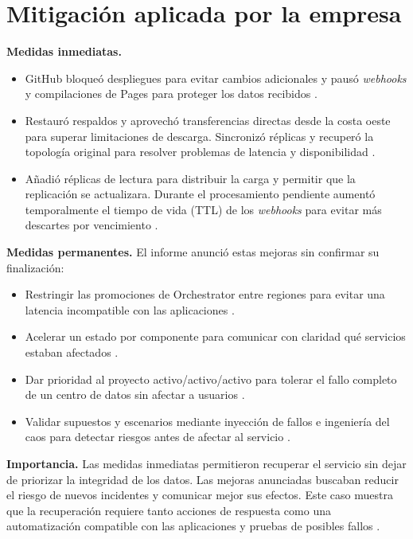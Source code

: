 \documentclass[11pt,a4paper]{article}
\begin{document}
\section{Mitigaci\'on aplicada por la empresa}
\textbf{Medidas inmediatas.}
\begin{itemize}
    \item GitHub bloque\'o despliegues para evitar cambios adicionales y paus\'o \textit{webhooks} y compilaciones de Pages para proteger los datos recibidos \cite{github2018}.
    \item Restaur\'o respaldos y aprovech\'o transferencias directas desde la costa oeste para superar limitaciones de descarga. Sincroniz\'o r\'eplicas y recuper\'o la topolog\'ia original para resolver problemas de latencia y disponibilidad \cite{github2018}.
    \item A\~nadi\'o r\'eplicas de lectura para distribuir la carga y permitir que la replicaci\'on se actualizara. Durante el procesamiento pendiente aument\'o temporalmente el tiempo de vida (TTL) de los \textit{webhooks} para evitar m\'as descartes por vencimiento \cite{github2018}.
\end{itemize}

\textbf{Medidas permanentes.} El informe anunci\'o estas mejoras sin confirmar su finalizaci\'on:
\begin{itemize}
    \item Restringir las promociones de Orchestrator entre regiones para evitar una latencia incompatible con las aplicaciones \cite{github2018}.
    \item Acelerar un estado por componente para comunicar con claridad qu\'e servicios estaban afectados \cite{github2018}.
    \item Dar prioridad al proyecto activo/activo/activo para tolerar el fallo completo de un centro de datos sin afectar a usuarios \cite{github2018}.
    \item Validar supuestos y escenarios mediante inyecci\'on de fallos e ingenier\'ia del caos para detectar riesgos antes de afectar al servicio \cite{github2018}.
\end{itemize}

\textbf{Importancia.} Las medidas inmediatas permitieron recuperar el servicio sin dejar de priorizar la integridad de los datos. Las mejoras anunciadas buscaban reducir el riesgo de nuevos incidentes y comunicar mejor sus efectos. Este caso muestra que la recuperaci\'on requiere tanto acciones de respuesta como una automatizaci\'on compatible con las aplicaciones y pruebas de posibles fallos \cite{github2018}.
\end{document}
